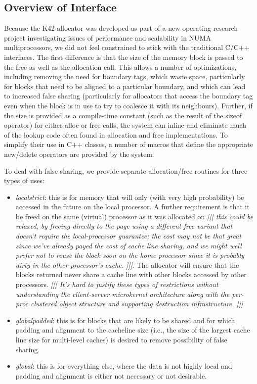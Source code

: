 \documentclass[dvips,11pt]{article}
\newcommand\fixnote[1]{\emph{[[[ #1 ]]]}}
\begin{document}
\subsection{Overview of Interface}

Because the K42 allocator was developed as part of a new operating research
project investigating issues of performance and scalability in NUMA
multiprocessors, we did not feel constrained to stick with the traditional
C/C++ interfaces.  The first difference is that the size of the memory
block is passed to the free as well as the allocation call.  This allows a
number of optimizations, including removing the need for boundary tags,
which waste space, particularly for blocks that need to be aligned to a
particular boundary, and which can lead to increased false sharing
(particularly for allocators that access the boundary tag even when the
block is in use to try to coalesce it with its neighbours).  Further, if
the size is provided as a compile-time constant (such as the result of the
sizeof operator) for either alloc or free calls, the system can inline and
eliminate much of the lookup code often found in allocation and free
implementations.  To simplify their use in C++ classes, a number of macros
that define the appropriate new/delete operators are provided by the
system.

To deal with false sharing, we provide separate allocation/free
routines for three types of uses:
\begin{itemize}
\item \emph{localstrict}: this is for memory that will only (with very high
  probability) be accessed in the future on the local processor.  A further
  requirement is that it be freed on the same (virtual) processor as it was
  allocated on \fixnote{this could be relaxed, by freeing directly to the
    page using a different free variant that doesn't require the
    local-processor guarantee; the cost may not be that great since we've
    already payed the cost of cache line sharing, and we might well prefer
    \emph{not} to reuse the block soon on the home processor since it is
    probably dirty in the other processor's cache.}.  The allocator will
  ensure that the blocks returned never share a cache line with other
  blocks accessed by other processors.  \fixnote{It's hard to justify these
    types of restrictions without understanding the client-server
    microkernel architecture along with the per-proc clustered object
    structure and supporting destruction infrastructure.}
\item \emph{globalpadded}: this is for blocks that are likely to be shared
  and for which padding and alignment to the cacheline size (i.e., the size
  of the largest cache line size for multi-level caches) is desired to
  remove possibility of false sharing.
\item \emph{global}: this is for everything else, where the data is not
  highly local and padding and alignment is either not necessary or not
  desirable.
\end{itemize}
\end{document}
